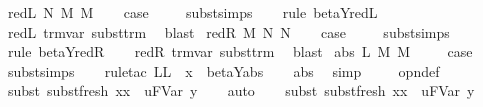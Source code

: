 \begin{isabellebody}
\isamarkupfalse%
\ {\isacharparenleft}red{\isacharunderscore}L\ N\ M\ M{\isacharprime}{\isacharparenright}\isanewline
\ \ \isamarkupfalse%
\ {\isacharquery}case\ \isanewline
\ \ \isamarkupfalse%
\ subst{\isachardot}simps\isanewline
\ \ \isamarkupfalse%
\ {\isacharparenleft}rule\ beta{\isacharunderscore}Y{\isachardot}red{\isacharunderscore}L{\isacharparenright}\isanewline
\ \ \isamarkupfalse%
\ red{\isacharunderscore}L\ trm{\isachardot}var\ subst{\isacharunderscore}trm\ \isamarkupfalse%
\ blast{\isacharplus}\isanewline
{}\isamarkupfalse%
\isanewline
{}\isamarkupfalse%
\ {\isacharparenleft}red{\isacharunderscore}R\ M\ N\ N{\isacharprime}{\isacharparenright}\isanewline
\ \ \isamarkupfalse%
\ {\isacharquery}case\ \isanewline
\ \ \isamarkupfalse%
\ subst{\isachardot}simps\isanewline
\ \ \isamarkupfalse%
\ {\isacharparenleft}rule\ beta{\isacharunderscore}Y{\isachardot}red{\isacharunderscore}R{\isacharparenright}\isanewline
\ \ \isamarkupfalse%
\ red{\isacharunderscore}R\ trm{\isachardot}var\ subst{\isacharunderscore}trm\ \isamarkupfalse%
\ blast{\isacharplus}\isanewline
{}\isamarkupfalse%
\isanewline
{}\isamarkupfalse%
\ {\isacharparenleft}abs\ L\ M\ M{\isacharprime}{\isacharparenright}\ \isanewline
\ \ \isamarkupfalse%
\ {\isacharquery}case\isanewline
\ \ \isamarkupfalse%
\ subst{\isachardot}simps\isanewline
\ \ \isamarkupfalse%
\ {\isacharparenleft}rule{\isacharunderscore}tac\ L{\isacharequal}{\isachardoublequoteopen}L\ {\isasymunion}\ {\isacharbraceleft}x{\isacharbraceright}{\isachardoublequoteclose}\ \ beta{\isacharunderscore}Y{\isachardot}abs{\isacharparenright}\isanewline
\ \ \isamarkupfalse%
\ abs\ \isamarkupfalse%
\ simp\ \isanewline
\ \ \isamarkupfalse%
\ opn{\isacharprime}{\isacharunderscore}def\isanewline
\ \ \isamarkupfalse%
\ {\isacharparenleft}subst\ subst{\isacharunderscore}fresh{}{\isacharbrackleft}\ x{\isacharequal}x\ \ u{\isacharequal}{\isachardoublequoteopen}FVar\ y{\isachardoublequoteclose}{\isacharbrackright}{\isacharparenright}\isanewline
\ \ \isamarkupfalse%
\ auto{\isacharbrackleft}{}{\isacharbrackright}\isanewline
\ \ \isamarkupfalse%
\ {\isacharparenleft}subst{\isacharparenleft}{}{\isacharparenright}\ subst{\isacharunderscore}fresh{}{\isacharbrackleft}\ x{\isacharequal}x\ \ u{\isacharequal}{\isachardoublequoteopen}FVar\ y{\isachardoublequoteclose}{\isacharbrackright}{\isacharparenright}\isanewline

\end{isabellebody}
